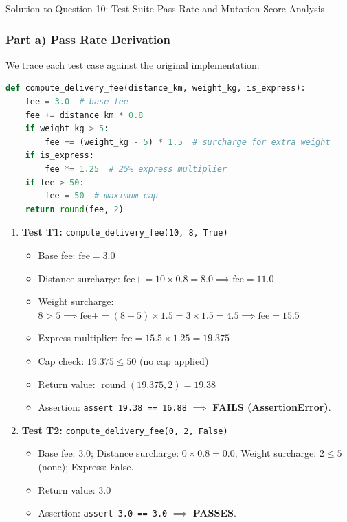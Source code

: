 \documentclass[11pt,a4paper]{article}
\begin{document}
\begin{solutionbox}{Solution to Question 10: Test Suite Pass Rate and Mutation Score Analysis}
\subsubsection*{Part a) Pass Rate Derivation}
We trace each test case against the original implementation:
\begin{lstlisting}[language=Python]
def compute_delivery_fee(distance_km, weight_kg, is_express):
    fee = 3.0  # base fee
    fee += distance_km * 0.8
    if weight_kg > 5:
        fee += (weight_kg - 5) * 1.5  # surcharge for extra weight
    if is_express:
        fee *= 1.25  # 25% express multiplier
    if fee > 50:
        fee = 50  # maximum cap
    return round(fee, 2)
\end{lstlisting}

\begin{enumerate}[label=\textbf{\arabic*.}]
    \item \textbf{Test T1:} \texttt{compute\_delivery\_fee(10, 8, True)}
    \begin{itemize}[itemsep=1pt]
        \item Base fee: $\text{fee} = 3.0$
        \item Distance surcharge: $\text{fee} += 10 \times 0.8 = 8.0 \implies \text{fee} = 11.0$
        \item Weight surcharge: $8 > 5 \implies \text{fee} += (8 - 5) \times 1.5 = 3 \times 1.5 = 4.5 \implies \text{fee} = 15.5$
        \item Express multiplier: $\text{fee} = 15.5 \times 1.25 = 19.375$
        \item Cap check: $19.375 \le 50$ (no cap applied)
        \item Return value: $\operatorname{round}(19.375, 2) = \mathbf{19.38}$
        \item Assertion: \texttt{assert 19.38 == 16.88} $\implies$ \textcolor{accentred}{\textbf{FAILS (AssertionError)}}.
    \end{itemize}
    
    \item \textbf{Test T2:} \texttt{compute\_delivery\_fee(0, 2, False)}
    \begin{itemize}[itemsep=1pt]
        \item Base fee: $3.0$; Distance surcharge: $0 \times 0.8 = 0.0$; Weight surcharge: $2 \le 5$ (none); Express: False.
        \item Return value: $\mathbf{3.0}$
        \item Assertion: \texttt{assert 3.0 == 3.0} $\implies$ \textcolor{accentgreen}{\textbf{PASSES}}.
    \end{itemize}
    

\end{enumerate}
\end{solutionbox}
\end{document}
